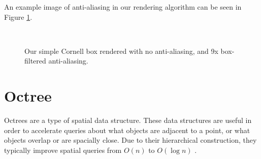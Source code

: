 An example image of anti-aliasing in our rendering algorithm can be seen in Figure \ref{fig:anti-aliasing}.

\begin{figure}[h!]
    \centering
    ~
    \caption[Anti-aliasing comparison]{Our simple Cornell box rendered with no anti-aliasing, and 9x box-filtered anti-aliasing.}
    \label{fig:anti-aliasing}
\end{figure}

\section{Octree}
\label{sec:octree}

Octrees are a type of spatial data structure. These data structures are useful in order to accelerate queries about what objects are adjacent to a point, or what objects overlap or are spacially close. Due to their hierarchical construction, they typically improve spatial queries from $O(n)$ to $O(\log{n})$ \cite{bib:rtr}. 


